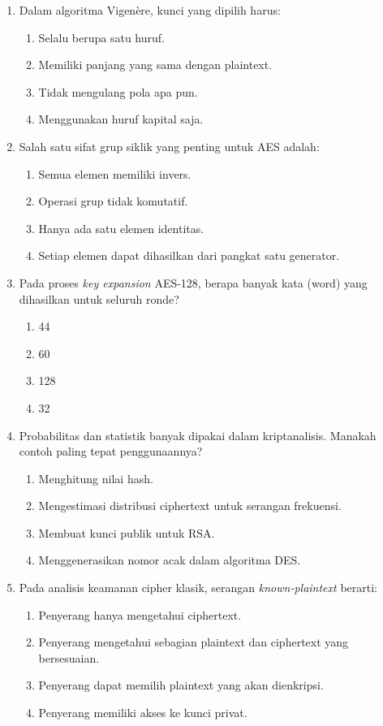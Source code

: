 \documentclass[12pt]{article}
\begin{document}
\begin{enumerate}[label=\textbf{Soal \arabic*.}, leftmargin=*, itemsep=1.5em]
    \item Dalam algoritma Vigenère, kunci yang dipilih harus:
    \begin{enumerate}[label=\Alph*.]
        \item Selalu berupa satu huruf.
        \item Memiliki panjang yang sama dengan plaintext.
        \item Tidak mengulang pola apa pun.
        \item Menggunakan huruf kapital saja.
    \end{enumerate}

    \item Salah satu sifat grup siklik yang penting untuk AES adalah:
    \begin{enumerate}[label=\Alph*.]
        \item Semua elemen memiliki invers.
        \item Operasi grup tidak komutatif.
        \item Hanya ada satu elemen identitas.
        \item Setiap elemen dapat dihasilkan dari pangkat satu generator.
    \end{enumerate}

    \item Pada proses \textit{key expansion} AES-128, berapa banyak kata (word) yang dihasilkan untuk seluruh ronde?
    \begin{enumerate}[label=\Alph*.]
        \item 44
        \item 60
        \item 128
        \item 32
    \end{enumerate}

    \item Probabilitas dan statistik banyak dipakai dalam kriptanalisis. Manakah contoh paling tepat penggunaannya?
    \begin{enumerate}[label=\Alph*.]
        \item Menghitung nilai hash.
        \item Mengestimasi distribusi ciphertext untuk serangan frekuensi.
        \item Membuat kunci publik untuk RSA.
        \item Menggenerasikan nomor acak dalam algoritma DES.
    \end{enumerate}

    \item Pada analisis keamanan cipher klasik, serangan \textit{known‑plaintext} berarti:
    \begin{enumerate}[label=\Alph*.]
        \item Penyerang hanya mengetahui ciphertext.
        \item Penyerang mengetahui sebagian plaintext dan ciphertext yang bersesuaian.
        \item Penyerang dapat memilih plaintext yang akan dienkripsi.
        \item Penyerang memiliki akses ke kunci privat.
    \end{enumerate}


\end{enumerate}
\end{document}
